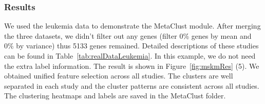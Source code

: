 \subsubsection{Results}

We used the leukemia data to demonstrate the MetaClust module.
After merging the three datasets, we didn't filter out any genes (filter 0\% genes by mean and 0\% by variance) thus 5133 genes remained.
Detailed descriptions of these studies can be found in Table~\ref{tab:realDataLeukemia}. 
In this example, we do not need the extra label information.
The result is shown in Figure~\ref{fig:mskmRes} {\color{red} (5)}.
We obtained unified feature selection across all studies.
The clusters are well separated in each study and the cluster patterns are consistent across all studies.
The clustering heatmaps and labels are saved in the MetaClust folder.










